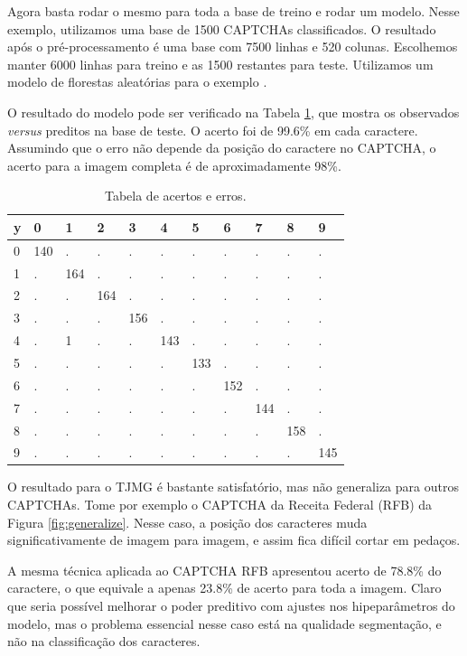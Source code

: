 \documentclass[12pt,]{report}
\begin{document}
Agora basta rodar o mesmo para toda a base de treino e rodar um modelo. Nesse exemplo, utilizamos uma base de 1500 CAPTCHAs classificados. O resultado após o pré-processamento é uma base com 7500 linhas e 520 colunas. Escolhemos manter 6000 linhas para treino e as 1500 restantes para teste. Utilizamos um modelo de florestas aleatórias para o exemplo \citep{breiman2001random}.

O resultado do modelo pode ser verificado na Tabela \ref{tab:errosTJMG}, que mostra os observados \emph{versus} preditos na base de teste. O acerto foi de 99.6\% em cada caractere. Assumindo que o erro não depende da posição do caractere no CAPTCHA, o acerto para a imagem completa é de aproximadamente 98\%.

\begin{table}

\caption{\label{tab:errosTJMG}Tabela de acertos e erros.}
\centering
\begin{tabular}[t]{l|l|l|l|l|l|l|l|l|l|l}
\hline
y & 0 & 1 & 2 & 3 & 4 & 5 & 6 & 7 & 8 & 9\\
\hline
0 & 140 & . & . & . & . & . & . & . & . & .\\
\hline
1 & . & 164 & . & . & . & . & . & . & . & .\\
\hline
2 & . & . & 164 & . & . & . & . & . & . & .\\
\hline
3 & . & . & . & 156 & . & . & . & . & . & .\\
\hline
4 & . & 1 & . & . & 143 & . & . & . & . & .\\
\hline
5 & . & . & . & . & . & 133 & . & . & . & .\\
\hline
6 & . & . & . & . & . & . & 152 & . & . & .\\
\hline
7 & . & . & . & . & . & . & . & 144 & . & .\\
\hline
8 & . & . & . & . & . & . & . & . & 158 & .\\
\hline
9 & . & . & . & . & . & . & . & . & . & 145\\
\hline
\end{tabular}
\end{table}

O resultado para o TJMG é bastante satisfatório, mas não generaliza para outros CAPTCHAs. Tome por exemplo o CAPTCHA da Receita Federal (RFB) da Figura \ref{fig:generalize}. Nesse caso, a posição dos caracteres muda significativamente de imagem para imagem, e assim fica difícil cortar em pedaços.

A mesma técnica aplicada ao CAPTCHA RFB apresentou acerto de 78.8\% do caractere, o que equivale a apenas 23.8\% de acerto para toda a imagem. Claro que seria possível melhorar o poder preditivo com ajustes nos hipeparâmetros do modelo, mas o problema essencial nesse caso está na qualidade segmentação, e não na classificação dos caracteres.
\end{document}
